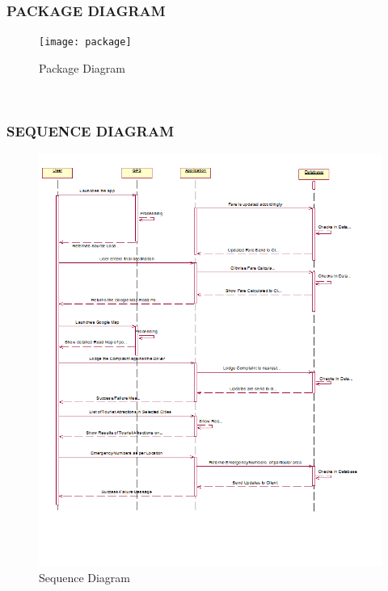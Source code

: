 \documentclass[12pt,a4paper]{article}
\begin{document}
\subsubsection{PACKAGE DIAGRAM}
\begin{figure}[!htb]
\centering
\texttt{[image: package]}
\caption{Package Diagram}
\end{figure}
\\
\newpage
\subsubsection{SEQUENCE DIAGRAM}
\begin{figure}[!htb]
\centering
\includegraphics[width=15 cm]{Seq}
\caption{Sequence Diagram}
\end{figure}
\\
\newpage
\end{document}
